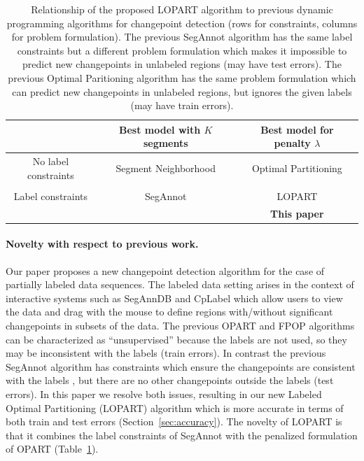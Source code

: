 \documentclass[12pt]{article}
\begin{document}
\begin{table}[t]
    \centering
    \begin{tabular}{ccc}
    \hline
         & Best model with $K$ segments & Best model for penalty $\lambda$  \\
         \hline
    No label constraints & Segment Neighborhood & Optimal Partitioning \\
    & \citep{segment-neighborhood} & \citep{Jackson2005} \\
    \hline
    Label constraints & SegAnnot & LOPART \\
    & \citep{Hocking2014} & \textbf{This paper}\\
    \hline
    \end{tabular}
    \caption{Relationship of the proposed LOPART algorithm to previous dynamic programming algorithms for changepoint detection (rows for constraints, columns for problem formulation). 
    The previous SegAnnot algorithm has the same label constraints but a different problem formulation which makes it impossible to predict new changepoints in unlabeled regions (may have test errors). 
    The previous Optimal Paritioning algorithm has the same problem formulation which can predict new changepoints in unlabeled regions, but ignores the given labels (may have train errors).
    }
    \label{tab:algos}
\end{table}

\paragraph{Novelty with respect to previous work.} Our paper proposes a new changepoint detection algorithm for the case of partially labeled data sequences.
The labeled data setting arises in the context of interactive systems such as SegAnnDB \citep{Hocking2014} and CpLabel \citep{Ford2020} which allow users to view the data and drag with the mouse to define regions with/without significant changepoints in subsets of the data.
The previous OPART and FPOP algorithms can be characterized as ``unsupervised'' because the labels are not used, so they may be inconsistent with the labels (train errors).
In contrast the previous SegAnnot algorithm has constraints which ensure the changepoints are consistent with the labels \citep{Hocking2014}, but there are no other changepoints outside the labels (test errors). 
In this paper we resolve both issues, resulting in our new Labeled Optimal Partitioning (LOPART) algorithm which is more accurate in terms of both train and test errors (Section~\ref{sec:accuracy}). 
The novelty of LOPART is that it combines the label constraints of SegAnnot with the penalized formulation of OPART (Table~\ref{tab:algos}).
\end{document}
